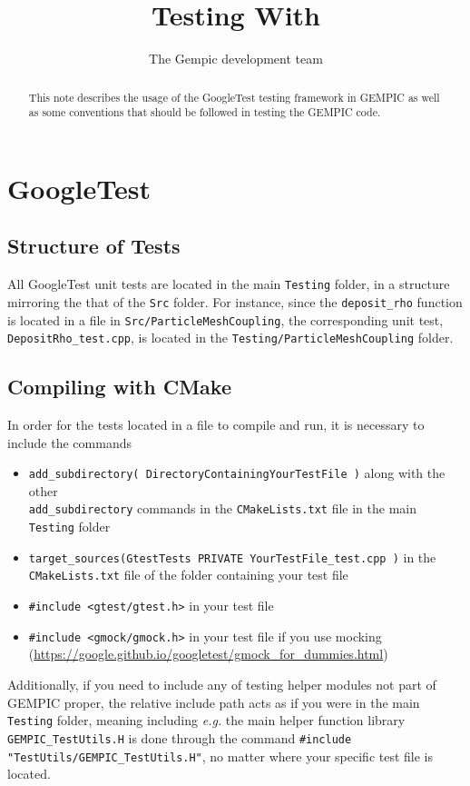 \documentclass[11pt]{article}
\title{Testing With \gt}
\author[1]{The Gempic development team}
\affil[1]{Max-Planck-Institut f\"ur Plasmaphysik, Garching, Germany}
\newcommand{\gt}{GoogleTest}
\newcommand{\pmc}{\texttt{Testing/ParticleMeshCoupling}}
\newcommand{\main}{main \texttt{Testing}}
\newcommand\loc[1]{in the #1 folder}
\begin{document}
\maketitle

\begin{abstract}
This note describes the usage of the \gt{} testing framework in GEMPIC as well as some conventions that should be followed in testing the GEMPIC code.
\end{abstract}

\tableofcontents

\section{GoogleTest}
\subsection{Structure of Tests}
All \gt{} unit tests are located \loc{\main}, in a structure mirroring the that of the \verb|Src| folder. For instance, since the \verb|deposit_rho| function is located in a file in \verb|Src/ParticleMeshCoupling|, the corresponding unit test, \verb|DepositRho_test.cpp|, is located \loc{\pmc}. 

\subsection{Compiling with CMake}
In order for the tests located in a file to compile and run, it is necessary to include the commands
\begin{itemize}
    \item \verb|add_subdirectory( DirectoryContainingYourTestFile )| along with the other\\
    \verb|add_subdirectory| commands in the \verb|CMakeLists.txt| file \loc{\main{}}
    \item \verb|target_sources(GtestTests PRIVATE YourTestFile_test.cpp )| in the \verb|CMakeLists.txt| file of the folder containing your test file
    \item \lstinline{#include <gtest/gtest.h>} in your test file
    \item \lstinline{#include <gmock/gmock.h>} in your test file if you use mocking (\url{https://google.github.io/googletest/gmock_for_dummies.html})
\end{itemize}
Additionally, if you need to include any of testing helper modules not part of GEMPIC proper, the relative include path acts as if you were \loc{\main}, meaning including \emph{e.g.} the main helper function library \verb|GEMPIC_TestUtils.H| is done through the command \lstinline{#include "TestUtils/GEMPIC_TestUtils.H"}, no matter where your specific test file is located.
\end{document}
